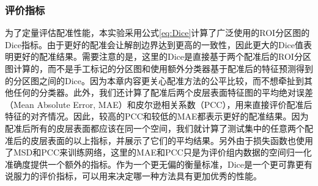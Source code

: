 \subsubsection{评价指标}\label{sec:配准的评价指标}
为了定量评估配准性能，本实验采用公式\ref{eq:Dice}计算了广泛使用的ROI分区图的Dice指标\cite{dice1945measures}。由于更好的配准会让解剖边界达到更高的一致性，因此更大的Dice值表明更好的配准结果。需要注意的是，这里的Dice是直接基于两个配准后的ROI分区图计算的，而不是手工标记的分区图和使用额外分类器基于配准后的特征预测得到的分区图之间的Dice。因为本章内容更关心配准方法的公平比较，而不想牵扯到其他任何的分类器。此外，我们还计算了配准后两个皮层表面特征图的平均绝对误差（Mean Absolute Error, MAE）和皮尔逊相关系数（PCC），用来直接评价配准后特征的对齐情况。因此，较高的PCC和较低的MAE都表示更好的配准结果。因为配准后所有的皮层表面都应该在同一个空间，我们就计算了测试集中的任意两个配准后的皮层表面的以上指标，并展示了它们的平均结果。另外由于损失函数也使用了MSD和PCC来训练网络，这里的MAE和PCC只是为评价组内数据的空间归一化准确度提供一个额外的指标。作为一个更无偏的衡量标准，Dice是一个更可靠更有说服力的评价指标，可以用来决定哪一种方法具有更加优秀的性能\cite{rohlfing2011image}。

